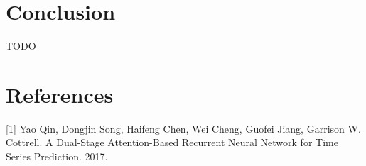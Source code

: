 \documentclass{article}
\begin{document}
\section{Conclusion}

TODO

\section*{References}

\small

[1] Yao Qin, Dongjin Song, Haifeng Chen, Wei Cheng, Guofei Jiang, Garrison W. 
Cottrell. A Dual-Stage Attention-Based Recurrent Neural Network for Time Series 
Prediction. 2017.
\end{document}
